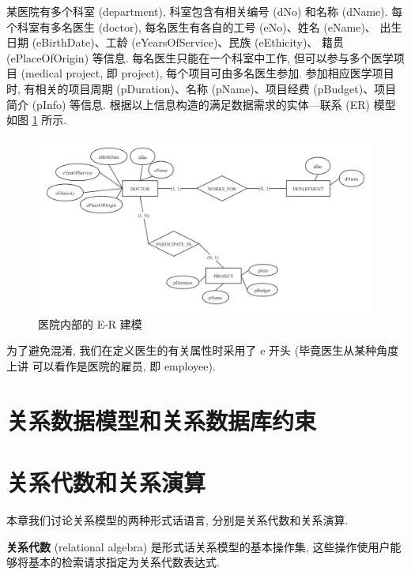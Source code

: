 \documentclass[10pt,UTF8]{book} %
\begin{document}
\begin{example}
    某医院有多个科室 (department), 科室包含有相关编号 (dNo) 和名称 (dName).
    每个科室有多名医生 (doctor), 每名医生有各自的工号 (eNo)、姓名 (eName)、
    出生日期 (eBirthDate)、工龄 (eYearsOfService)、民族 (eEthicity)、
    籍贯 (ePlaceOfOrigin) 等信息.
    每名医生只能在一个科室中工作, 但可以参与多个医学项目 (medical project,
    即 project), 每个项目可由多名医生参加.
    参加相应医学项目时, 有相关的项目周期 (pDuration)、名称 (pName)、项目经费
    (pBudget)、项目简介 (pInfo) 等信息.
    根据以上信息构造的满足数据需求的实体—联系 (ER) 模型 
    如图 \ref{example-er:doctor-department-project} 所示.
    \begin{figure}[H]
        \centering
        \includegraphics*[width=\textwidth]{pic/ER_医院科室.png}
        \caption{医院内部的 E-R 建模}
        \label{example-er:doctor-department-project}
    \end{figure}
    为了避免混淆, 我们在定义医生的有关属性时采用了 e 开头 (毕竟医生从某种角度上讲
    可以看作是医院的雇员, 即 employee).
\end{example}

\chapter{关系数据模型和关系数据库约束}




\chapter{关系代数和关系演算}

本章我们讨论关系模型的两种形式话语言, 分别是关系代数和关系演算.

\textbf{关系代数} (relational algebra) 是形式话关系模型的基本操作集,
这些操作使用户能够将基本的检索请求指定为关系代数表达式.
\end{document}
